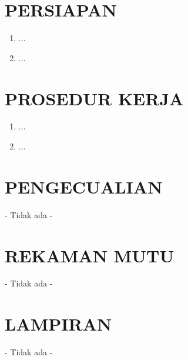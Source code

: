 \documentclass[12pt]{soi}
\begin{document}
    \section{PERSIAPAN}
    \begin{enumerate}
        \item ...
        \item ...
    \end{enumerate}

    \section{PROSEDUR KERJA}
    \begin{enumerate}
        \item ...
        \item ...
    \end{enumerate}

    \section{PENGECUALIAN}
    - Tidak ada -

    \section{REKAMAN MUTU}
    - Tidak ada -

    \section{LAMPIRAN}
    - Tidak ada -
\end{document}
